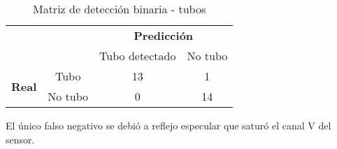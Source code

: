 \begin{table}[H]
\centering
\begin{tabular}{cc|c|c|}
\cline{3-4}
& & \multicolumn{2}{c|}{\textbf{Predicción}} \\ \cline{3-4}
& & Tubo detectado & No tubo \\ \hline
\multicolumn{1}{|c|}{\multirow{2}{*}{\textbf{Real}}} & Tubo & 13 & 1 \\ \cline{2-4}
\multicolumn{1}{|c|}{} & No tubo & 0 & 14 \\ \hline
\end{tabular}
\caption{Matriz de detección binaria - tubos}
\label{tab:confusion_tubos}
\end{table}

\noindent
El único falso negativo se debió a reflejo especular que saturó el canal V del sensor.
